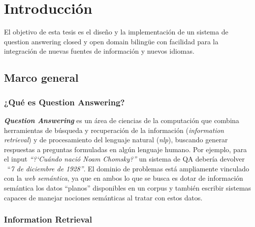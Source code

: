 \chapter{Introducción}
El objetivo de esta tesis es el diseño y la implementación de un sistema de question answering closed y open domain bilingüe con facilidad para la integración de nuevas fuentes de información y nuevos idiomas.
\section{Marco general}
\subsection{¿Qué es Question Answering?}

\textbf{\textit{Question Answering }}es un \'area de ciencias de la
computaci\'on que combina herramientas de b\'usqueda y recuperaci\'on
de la informaci\'on (\textit{information retrieval}) y de procesamiento del lenguaje natural (\textit{nlp}), buscando
generar respuestas a preguntas formuladas en alg\'un lenguaje humano.
Por ejemplo, para el input \textit{{\textquotedblleft}?`Cu\'ando
naci\'o Noam Chomsky?{\textquotedblright}} un sistema de QA deber\'ia
devolver \ {\textquotedblleft}\textit{7 de diciembre de
1928{\textquotedblright}}. El dominio de problemas est\'a ampliamente
vinculado con la \textit{web sem\'antica}, ya que en ambos lo que se busca es dotar de
informaci\'on sem\'antica los datos
{\textquotedblleft}planos{\textquotedblright} disponibles en un corpus y
tambi\'en escribir sistemas capaces de manejar nociones sem\'anticas al
tratar con estos datos. 


\subsection{Information Retrieval}


